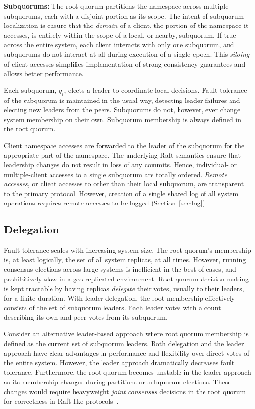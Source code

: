 \documentclass[letterpaper,10pt,twocolumn]{article}
\newcommand{\sub}{subquorum\xspace}
\newcommand{\Sub}{Subquorum\xspace}
\newcommand{\subs}{subquorums\xspace}
\newcommand{\Subs}{Subquorums\xspace}
\newcommand{\roo}{root quorum\xspace}
\newcommand{\Roo}{Root quorum\xspace}
\newcommand{\para}[1]{\vspace{.04in}\noindent\textbf{#1}}
\begin{document}
\para{\Subs:}
The \roo partitions the namespace across multiple \subs, each with a
disjoint portion as its scope.
The intent of \sub localization is ensure that the \emph{domain} of a
client, the portion of the namespace it accesses, is entirely within the
scope of a local, or nearby, \sub.
If true across the entire system, each client interacts with only one
\sub, and \subs do not interact at all during execution of a single
epoch.
This \emph{siloing} of client accesses simplifies implementation of strong
consistency guarantees and allows better performance.


Each \sub, $q_i$, elects a leader to coordinate local decisions.
Fault tolerance of the \sub is maintained in the usual way, detecting leader
failures and electing new leaders from the peers.
\Subs do not, however, ever change system membership on their own. \Sub
membership is always defined in the \roo.

Client namespace accesses are forwarded to the leader of the \sub for the
appropriate part of the namespace.
The underlying Raft semantics ensure that leadership changes do not result in
loss of any commits.
Hence, individual- or multiple-client accesses to a single \sub are totally
ordered.
\emph{Remote accesses}, or client accesses to other than their local \sub, are
transparent to the primary protocol. However, creation of a single shared log
of all system operations requires remote accesses to be logged (Section~\ref{sec:log}).

\subsection{Delegation}
\label{sec:delegations}
Fault tolerance scales with increasing
system size.
The \roo's membership is, at least logically, the set of all system replicas,
at all times.
However, running consensus elections across large systems is inefficient in
the best of cases, and prohibitively slow in a geo-replicated environment.
\Roo decision-making is kept tractable by having replicas
\emph{delegate} their votes, usually to their leaders, for a finite duration.
With leader delegation, the root membership effectively consists of the set of
\sub leaders.
Each leader votes with a count describing its own and peer votes from its
\sub.

Consider an alternative leader-based approach where \roo membership is
defined as the current set of \sub leaders.
Both delegation and the leader approach have clear advantages in
performance and flexibility over direct votes
of the entire system.
However, the leader approach dramatically decreases fault tolerance.
Furthermore, the \roo becomes unstable in the leader approach as its
membership changes during partitions or \sub elections.
These changes would require heavyweight \emph{joint
consensus} decisions in the \roo for correctness in Raft-like protocols~\cite{raft}.
\end{document}
